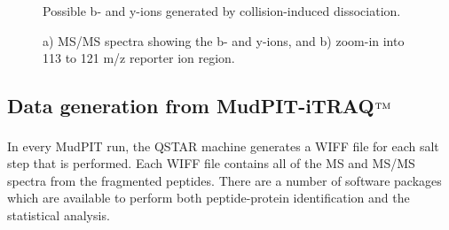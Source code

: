 \begin{figure}[!htb]
\caption{Possible b- and y-ions generated by collision-induced dissociation.}
\label{fig:CID}
\end{figure}

\begin{figure}[!htb]
\caption{a) MS/MS spectra showing the b- and y-ions, and b) zoom-in into 113 to 121 m/z reporter ion region.}
\label{fig:spectrum}
\end{figure}

\subsection{Data generation from MudPIT-iTRAQ$^{\rm TM}$}\label{sec:data}
In every MudPIT run, the QSTAR\textsuperscript{\textregistered} machine generates a WIFF file for each salt step that is performed. Each WIFF file contains all of the MS and MS/MS spectra from the fragmented peptides. There are a number of software packages which are available to perform both peptide-protein identification and the statistical analysis. 

